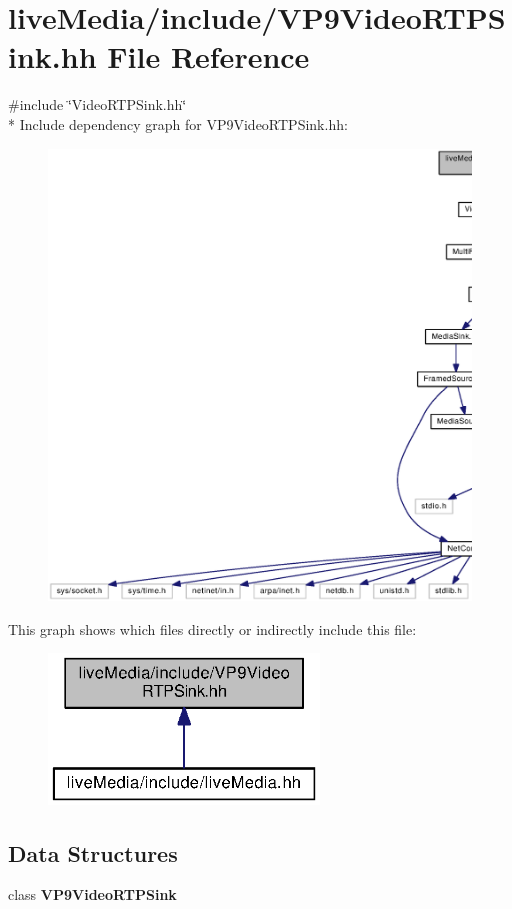 \section{live\+Media/include/\+V\+P9\+Video\+R\+T\+P\+Sink.hh File Reference}
\label{VP9VideoRTPSink_8hh}
{\ttfamily \#include \char`\"{}Video\+R\+T\+P\+Sink.\+hh\char`\"{}}\\*
Include dependency graph for V\+P9\+Video\+R\+T\+P\+Sink.\+hh\+:
\nopagebreak
\begin{figure}[H]
\begin{center}
\leavevmode
\includegraphics[width=350pt]{VP9VideoRTPSink_8hh__incl}
\end{center}
\end{figure}
This graph shows which files directly or indirectly include this file\+:
\nopagebreak
\begin{figure}[H]
\begin{center}
\leavevmode
\includegraphics[width=204pt]{VP9VideoRTPSink_8hh__dep__incl}
\end{center}
\end{figure}
\subsection*{Data Structures}
\begin{DoxyCompactItemize}
\item 
class {\bf V\+P9\+Video\+R\+T\+P\+Sink}
\end{DoxyCompactItemize}
